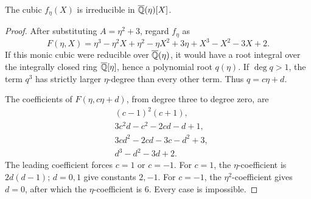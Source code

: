 \begin{lemma}\label{lem:absolute-irreducible}
The cubic $f_\eta(X)$ is irreducible in $\overline{\mathbb Q}(\eta)[X]$.
\end{lemma}

\begin{proof}
After substituting $A=\eta^2+3$, regard $f_\eta$ as
\begin{equation}\label{eq:F-plane}
 F(\eta,X)=
 \eta^3-\eta^2X+\eta^2-\eta X^2+3\eta
 +X^3-X^2-3X+2.
\end{equation}
If this monic cubic were reducible over $\overline{\mathbb Q}(\eta)$, it would have a root
integral over the integrally closed ring $\overline{\mathbb Q}[\eta]$, hence a polynomial
root $q(\eta)$.  If $\deg q>1$, the term $q^3$ has strictly larger
$\eta$-degree than every other term.  Thus $q=c\eta+d$.

The coefficients of $F(\eta,c\eta+d)$, from degree three to degree zero,
are
\begin{align*}
 &(c-1)^2(c+1),\\
 &3c^2d-c^2-2cd-d+1,\\
 &3cd^2-2cd-3c-d^2+3,\\
 &d^3-d^2-3d+2.
\end{align*}
The leading coefficient forces $c=1$ or $c=-1$.  For $c=1$, the
$\eta$-coefficient is $2d(d-1)$; $d=0,1$ give constants $2,-1$.
For $c=-1$, the $\eta^2$-coefficient gives $d=0$, after which the
$\eta$-coefficient is $6$.  Every case is impossible.
\end{proof}
